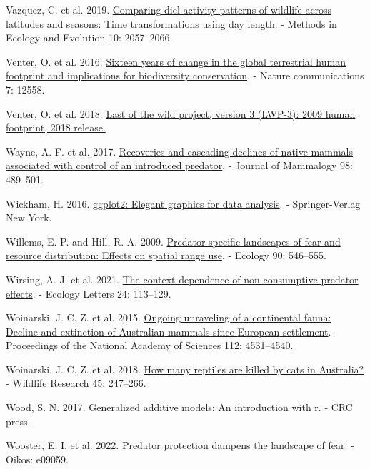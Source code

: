 \documentclass[preprint, 3p, authoryear]{elsarticle} %
\newlength{\cslhangindent}
\newlength{\cslentryspacingunit} %
\newenvironment{CSLReferences}[2] %
 {%
  \setlength{\parindent}{0pt}
  \ifodd #1
  \let\oldpar\par
  \def\par{\hangindent=\cslhangindent\oldpar}
  \fi
  \setlength{\parskip}{#2\cslentryspacingunit}
 }%
 {}
\begin{document}
\begin{CSLReferences}{1}{0}
\leavevmode{}%
Vazquez, C. et al. 2019. \href{https://doi.org/10.1111/2041-210X.13290}{Comparing diel activity patterns of wildlife across latitudes and seasons: Time transformations using day length}. - Methods in Ecology and Evolution 10: 2057--2066.

\leavevmode{}%
Venter, O. et al. 2016. \href{https://doi.org/10.1038/ncomms12558}{Sixteen years of change in the global terrestrial human footprint and implications for biodiversity conservation}. - Nature communications 7: 12558.

\leavevmode{}%
Venter, O. et al. 2018. \href{https://doi.org/10.7927/H46T0JQ4.}{Last of the wild project, version 3 (LWP-3): 2009 human footprint, 2018 release.}

\leavevmode{}%
Wayne, A. F. et al. 2017. \href{https://doi.org/10.1093/jmammal/gyw237}{{Recoveries and cascading declines of native mammals associated with control of an introduced predator}}. - Journal of Mammalogy 98: 489--501.

\leavevmode{}%
Wickham, H. 2016. \href{https://ggplot2.tidyverse.org}{{g}gplot2: Elegant graphics for data analysis}. - Springer-Verlag New York.

\leavevmode{}%
Willems, E. P. and Hill, R. A. 2009. \href{https://doi.org/10.1890/08-0765.1}{Predator-specific landscapes of fear and resource distribution: Effects on spatial range use}. - Ecology 90: 546--555.

\leavevmode{}%
Wirsing, A. J. et al. 2021. \href{https://doi.org/10.1111/ele.13614}{The context dependence of non-consumptive predator effects}. - Ecology Letters 24: 113--129.

\leavevmode{}%
Woinarski, J. C. Z. et al. 2015. \href{https://doi.org/10.1073/pnas.1417301112}{Ongoing unraveling of a continental fauna: Decline and extinction of {{A}ustralian} mammals since {European} settlement}. - Proceedings of the National Academy of Sciences 112: 4531--4540.

\leavevmode{}%
Woinarski, J. C. Z. et al. 2018. \href{https://doi.org/10.1071/WR17160}{How many reptiles are killed by cats in {{A}ustralia}?} - Wildlife Research 45: 247--266.

\leavevmode{}%
Wood, S. N. 2017. Generalized additive models: An introduction with r. - CRC press.

\leavevmode{}%
Wooster, E. I. et al. 2022. \href{https://doi.org/10.1111/oik.09059}{Predator protection dampens the landscape of fear}. - Oikos: e09059.

\end{CSLReferences}
\end{document}
